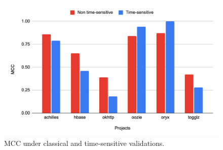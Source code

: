 \begin{figure}
  \hfill
  \begin{minipage}[b]{0.4\textwidth}
    \includegraphics[width=\textwidth]{figures/replication/RQ1JavaMcc.png}
    \caption{MCC under classical and time-sensitive validations.}
    \label{fig:mcc-java}
  \end{minipage}
\end{figure}



